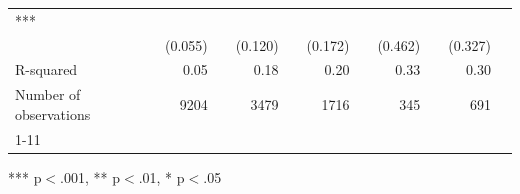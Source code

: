 \documentclass{article}
\begin{document}
\begin{table}[!h]
\begin{tabular}{lllllllllll}
  \multicolumn{1}{l}{***} \\
\multicolumn{1}{l}{} &
  \multicolumn{1}{r}{(0.055)} &
  \multicolumn{1}{l}{} &
  \multicolumn{1}{r}{(0.120)} &
  \multicolumn{1}{l}{} &
  \multicolumn{1}{r}{(0.172)} &
  \multicolumn{1}{l}{} &
  \multicolumn{1}{r}{(0.462)} &
  \multicolumn{1}{l}{} &
  \multicolumn{1}{r}{(0.327)} &
  \multicolumn{1}{l}{} \\
\multicolumn{1}{l}{R-squared} &
  \multicolumn{1}{r}{0.05} &
  \multicolumn{1}{l}{} &
  \multicolumn{1}{r}{0.18} &
  \multicolumn{1}{l}{} &
  \multicolumn{1}{r}{0.20} &
  \multicolumn{1}{l}{} &
  \multicolumn{1}{r}{0.33} &
  \multicolumn{1}{l}{} &
  \multicolumn{1}{r}{0.30} &
  \multicolumn{1}{l}{} \\
\multicolumn{1}{l}{Number of observations} &
  \multicolumn{1}{r}{9204} &
  \multicolumn{1}{l}{} &
  \multicolumn{1}{r}{3479} &
  \multicolumn{1}{l}{} &
  \multicolumn{1}{r}{1716} &
  \multicolumn{1}{l}{} &
  \multicolumn{1}{r}{345} &
  \multicolumn{1}{l}{} &
  \multicolumn{1}{r}{691} &
  \multicolumn{1}{l}{} \\
\cline{1-11}
\end{tabular}

\footnotesize{
*** p$<$.001, ** p$<$.01, * p$<$.05
}
\end{table}
\end{document}
